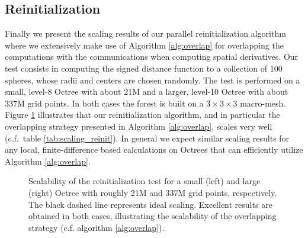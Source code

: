 \subsection{Reinitialization} \label{section::scaling_reinitialization}

Finally we present the scaling results of our parallel reinitialization algorithm where we extensively make use of Algorithm \ref{alg:overlap} for overlapping the computations with the communications when computing spatial derivatives. Our test consists in computing the signed distance function to a collection of 100 spheres, whose radii and centers are chosen randomly. The test is performed on a small, level-8 Octree with about 21M and a larger, level-10 Octree with about 337M grid points. In both cases the forest is built on a $3\times3\times3$ macro-mesh. Figure \ref{fig:reinit} illustrates that our reinitialization algorithm, and in particular the overlapping strategy presented in Algorithm \ref{alg:overlap}, scales very well (c.f.\ table \ref{tab:scaling_reinit}). In general we expect similar scaling results for any local, finite-difference based calculations on Octrees that can efficiently utilize Algorithm \ref{alg:overlap}. 
\begin{figure}
\centering
{}
\caption{Scalability of the reinitialization test for a small (left) and large (right) Octree with roughly 21M and 337M grid points, respectively. The black dashed line represents ideal scaling. Excellent results are obtained in both cases, illustrating the scalability of the overlapping strategy (c.f. algorithm \ref{alg:overlap}).}
\label{fig:reinit}
\end{figure}

